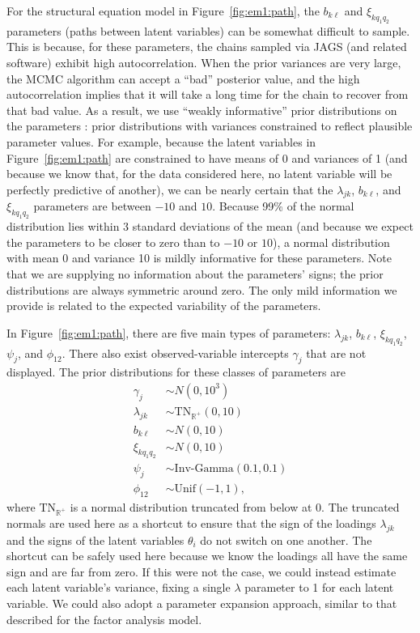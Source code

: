 For the structural equation model in Figure~\ref{fig:em1:path}, the $b_{k\ell}$ and $\xi_{kq_{1}q_{2}}$ parameters (paths between latent variables) can be somewhat difficult to sample.  This is because, for these parameters, the chains sampled via JAGS (and related software) exhibit high autocorrelation.  When the prior variances are very large, the MCMC algorithm can accept a ``bad'' posterior value, and the high autocorrelation implies that it will take a long time for the chain to recover from that bad value.  As a result, we use ``weakly informative'' prior distributions on the parameters \cite{gel06}: prior distributions with variances constrained to reflect plausible parameter values.  For example, because the latent variables in Figure~\ref{fig:em1:path} are constrained to have means of 0 and variances of 1 (and because we know that, for the data considered here, no latent variable will be perfectly predictive of another), we can be nearly certain that the $\lambda_{jk}$, $b_{k\ell}$, and $\xi_{kq_{1}q_{2}}$ parameters are between $-10$ and $10$.  Because 99\% of the normal distribution lies within 3 standard deviations of the mean (and because we expect the parameters to be closer to zero than to $-10$ or $10$), a normal distribution with mean 0 and variance 10 is mildly informative for these parameters.  Note that we are supplying no information about the parameters' signs; the prior distributions are always symmetric around zero.  The only mild information we provide is related to the expected variability of the parameters.

In Figure~\ref{fig:em1:path}, there are five main types of parameters: $\lambda_{jk}$, $b_{k\ell}$, $\xi_{kq_{1}q_{2}}$, $\psi_j$, and $\phi_{12}$.  There also exist observed-variable intercepts $\gamma_j$ that are not displayed.  The prior distributions for these classes of parameters are
\begin{align}
    \gamma_j &\sim N(0,10^3) \\
    \lambda_{jk} &\sim \text{TN}_{\mathbb{R}^+}(0,10) \\
    b_{k\ell} &\sim N(0,10) \\
    \xi_{kq_{1}q_{2}} &\sim N(0,10) \\
    \psi_{j} &\sim \text{Inv-Gamma}(0.1,0.1) \\
    \phi_{12} &\sim \text{Unif}(-1,1),
\end{align}
where $\text{TN}_{\mathbb{R}^+}$ is a normal distribution truncated from below at 0.  The truncated normals are used here as a shortcut to ensure that the sign of the loadings $\lambda_{jk}$ and the signs of the latent variables $\theta_{i}$ do not switch on one another.  The shortcut can be safely used here because we know the loadings all have the same sign and are far from zero.  If this were not the case, we could instead estimate each latent variable's variance, fixing a single $\lambda$ parameter to 1 for each latent variable.  We could also adopt a parameter expansion approach, similar to that described for the factor analysis model. 

